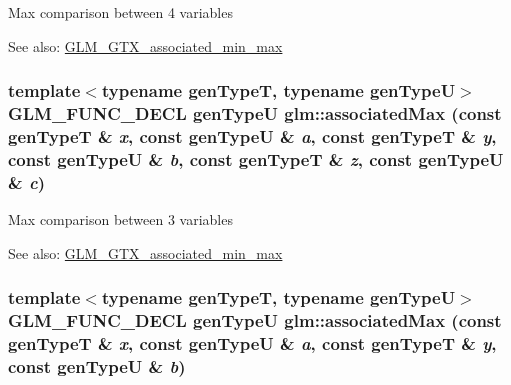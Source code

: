 Max comparison between 4 variables \begin{Desc}
\item[See also:]\hyperlink{group__gtx__associated__min__max}{GLM\_\-GTX\_\-associated\_\-min\_\-max} \end{Desc}
\hypertarget{group__gtx__associated__min__max_g120284c5b592366690f3dd6a110f3605}{
\subsubsection[associatedMax]{\setlength{\rightskip}{0pt plus 5cm}template$<$typename genTypeT, typename genTypeU$>$ GLM\_\-FUNC\_\-DECL genTypeU glm::associatedMax (const genTypeT \& {\em x}, \/  const genTypeU \& {\em a}, \/  const genTypeT \& {\em y}, \/  const genTypeU \& {\em b}, \/  const genTypeT \& {\em z}, \/  const genTypeU \& {\em c})}}
\label{group__gtx__associated__min__max_g120284c5b592366690f3dd6a110f3605}


Max comparison between 3 variables \begin{Desc}
\item[See also:]\hyperlink{group__gtx__associated__min__max}{GLM\_\-GTX\_\-associated\_\-min\_\-max} \end{Desc}
\hypertarget{group__gtx__associated__min__max_g615648ddc725239945caf272498ae4ad}{
\subsubsection[associatedMax]{\setlength{\rightskip}{0pt plus 5cm}template$<$typename genTypeT, typename genTypeU$>$ GLM\_\-FUNC\_\-DECL genTypeU glm::associatedMax (const genTypeT \& {\em x}, \/  const genTypeU \& {\em a}, \/  const genTypeT \& {\em y}, \/  const genTypeU \& {\em b})}}
\label{group__gtx__associated__min__max_g615648ddc725239945caf272498ae4ad}


